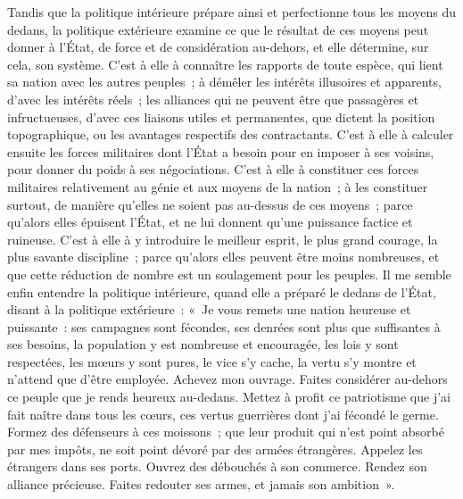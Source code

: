 \documentclass[french,twoside]{book} %
\begin{document}
Tandis que la politique intérieure prépare ainsi et perfectionne tous les moyens du dedans, la politique extérieure examine ce que le résultat de ces moyens peut donner à l’État, de force et de considération au-dehors, et elle détermine, sur cela, son système. C’est à elle à connaître les rapports de toute espèce, qui lient sa nation avec les autres peuples ; à démêler les intérêts illusoires et apparents, d’avec les intérêts réels ; les alliances qui ne peuvent être que passagères et infructueuses, d’avec ces liaisons utiles et permanentes, que dictent la position topographique, ou les avantages respectifs des contractants. C’est à elle à calculer ensuite les forces militaires dont l’État a besoin pour en imposer à ses voisins, pour donner du poids à ses négociations. C’est à elle à constituer ces forces militaires relativement au génie et aux moyens de la nation ; à les constituer surtout, de manière qu’elles ne soient pas au-dessus de ces moyens ; parce qu’alors elles épuisent l’État, et ne lui donnent qu’une puissance factice et ruineuse. C’est à elle à y introduire le meilleur esprit, le plus grand courage, la plus savante discipline ; parce qu’alors elles peuvent être moins nombreuses, et que cette réduction de nombre est un soulagement pour les peuples. Il me semble enfin entendre la politique intérieure, quand elle a préparé le dedans de l’État, disant à la politique extérieure : « Je vous remets une nation heureuse et puissante : ses campagnes sont fécondes, ses denrées sont plus que suffisantes à ses besoins, la population y est nombreuse et encouragée, les lois y sont respectées, les mœurs y sont pures, le vice s’y cache, la vertu s’y montre et n’attend que d’être employée. Achevez mon ouvrage. Faites considérer au-dehors ce peuple que je rends heureux au-dedans. Mettez à profit ce patriotisme que j’ai fait naître dans tous les cœurs, ces vertus guerrières dont j’ai fécondé le germe. Formez des défenseurs à ces moissons ; que leur produit qui n’est point absorbé par mes impôts, ne soit point dévoré par des armées étrangères. Appelez les étrangers dans ses ports. Ouvrez des débouchés à son commerce. Rendez son alliance précieuse. Faites redouter ses armes, et jamais son ambition ».\par
\end{document}
